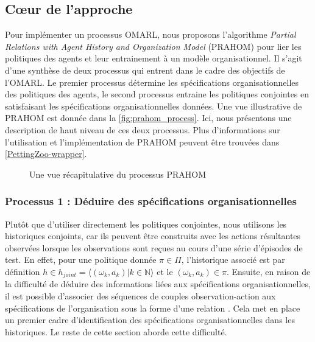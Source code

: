 \subsection{Cœur de l'approche}

Pour implémenter un processus OMARL, nous proposons l'algorithme \emph{Partial Relations with Agent History and Organization Model} (PRAHOM) pour lier les politiques des agents et leur entrainement à un modèle organisationnel.
Il s'agit d'une synthèse de deux processus qui entrent dans le cadre des objectifs de l'OMARL. Le premier processus détermine les spécifications organisationnelles des politiques des agents, le second processus entraine les politiques conjointes en satisfaisant les spécifications organisationnelles données. Une vue illustrative de PRAHOM est donnée dans la \autoref{fig:prahom_process}.
Ici, nous présentons une description de haut niveau de ces deux processus. Plus d'informations sur l'utilisation et l'implémentation de PRAHOM peuvent être trouvées dans \autoref{PettingZoo-wrapper}.

\begin{figure}[h!]
  \centering
  
  \caption{Une vue récapitulative du processus PRAHOM}
  \label{fig:prahom_process}
\end{figure}

\subsubsection{Processus 1 : Déduire des spécifications organisationnelles}

Plutôt que d'utiliser directement les politiques conjointes, nous utilisons les historiques conjoints, car ils peuvent être construits avec les actions résultantes observées lorsque les observations sont reçues au cours d'une série d'épisodes de test. En effet, pour une politique donnée $\pi \in \Pi$, l'historique associé est par définition $h \in h_{joint} = \langle(\omega_k,a_k) | k \in \mathbb{N}\rangle$ et le $(\omega_k,a_k) \in \pi$.
Ensuite, en raison de la difficulté de déduire des informations liées aux spécifications organisationnelles, il est possible d'associer des séquences de couples observation-action aux spécifications de l'organisation sous la forme d'une relation . Cela met en place un premier cadre d'identification des spécifications organisationnelles dans les historiques. Le reste de cette section aborde cette difficulté.

